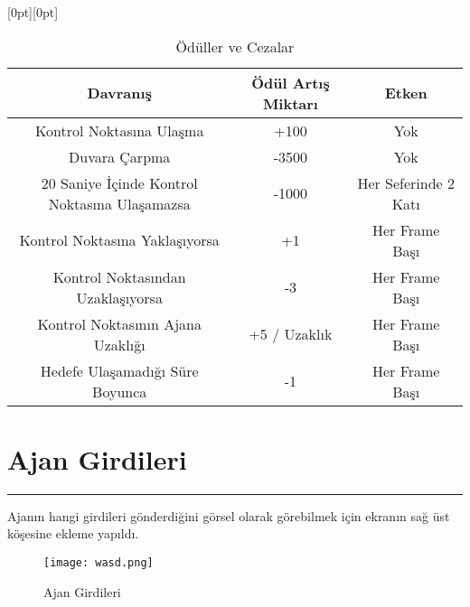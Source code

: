 \documentclass{article}
\begin{document}
\newpage

\thispagestyle{empty}
\begin{landscape}

\raisebox{5cm}[0pt][0pt]

\captionsetup[table]{justification=raggedright, singlelinecheck=false}

\renewcommand{\tablename}{Tablo}
\renewcommand{\arraystretch}{1.5} %

\begin{table}[h!]
\centering
  \Large %
    \caption {Ödüller ve Cezalar}
  \begin{tabular}{|c|c|c|}
    \hline
    \textbf{Davranış} & \textbf{Ödül Artış Miktarı} & \textbf{Etken}\\
    \hline
    Kontrol Noktasına Ulaşma & +100 & Yok \\
    \hline
    Duvara Çarpma & -3500 & Yok \\
    \hline
    20 Saniye İçinde Kontrol Noktasına Ulaşamazsa & -1000 & Her Seferinde 2 Katı \\
    \hline
    Kontrol Noktasına Yaklaşıyorsa & +1 & Her Frame Başı \\
    \hline
    Kontrol Noktasından Uzaklaşıyorsa & -3 & Her Frame Başı \\
    \hline
    Kontrol Noktasının Ajana Uzaklığı & +5 / Uzaklık & Her Frame Başı \\
    \hline
    Hedefe Ulaşamadığı Süre Boyunca & -1 & Her Frame Başı \\
    \hline
  \end{tabular}
\end{table}

\end{landscape}

\newpage

\section{Ajan Girdileri}
\rule{\textwidth}{0.5pt}
\par Ajanın hangi girdileri gönderdiğini görsel olarak görebilmek için ekranın sağ üst köşesine ekleme yapıldı.\\[5pt]

\begin{figure}[h]
    \begin{center}
        \texttt{[image: wasd.png]}
    \end{center}
      \caption{Ajan Girdileri}
\end{figure}
\end{document}
